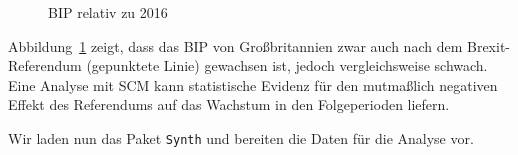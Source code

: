 \documentclass[
  a4paper,
  DIV=11,
  oneside]{scrreprt}
\begin{document}
\begin{figure}[t]


\caption{\label{fig-bipv}BIP relativ zu 2016}

\end{figure}%

Abbildung~\ref{fig-bipv} zeigt, dass das BIP von Großbritannien zwar
auch nach dem Brexit-Referendum (gepunktete Linie) gewachsen ist, jedoch
vergleichsweise schwach. Eine Analyse mit SCM kann statistische Evidenz
für den mutmaßlich negativen Effekt des Referendums auf das Wachstum in
den Folgeperioden liefern.

Wir laden nun das Paket \texttt{Synth} und bereiten die Daten für die
Analyse vor.
\end{document}
